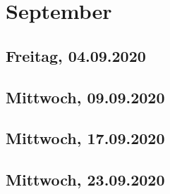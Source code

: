 \documentclass[../main.tex]{subfiles}
\begin{document}
	\section{September}
	
	\subsection{Freitag, 04.09.2020}
	
	\subsection{Mittwoch, 09.09.2020}
	
	\subsection{Mittwoch, 17.09.2020}
	
	\subsection{Mittwoch, 23.09.2020}
\end{document}
